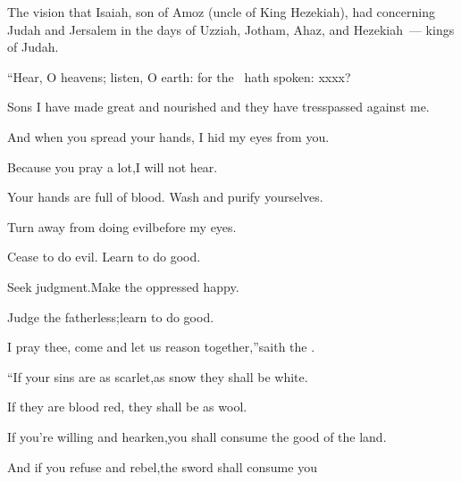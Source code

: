 
\begin{inparaenum}
   The vision that Isaiah, son of Amoz (uncle of King Hezekiah), had concerning Judah and Jersalem in the days of Uzziah, Jotham, Ahaz, and Hezekiah~--- kings of Judah.\smallskip%
  
  \pa {} ``Hear, O heavens; listen, O earth: for the \lord\ hath spoken: xxxx?%
  
  \pa Sons I have made great and nourished and they have tresspassed against me.
  
  
  \pb {} And when you spread your hands,%
  \pa I hid my eyes from you.%
  
  \pc Because you pray a lot,\pa I will not hear.%
  
  \pc Your hands are full of blood.\pa {} Wash and purify yourselves.%
  
  \pc Turn away from doing evil\pa before my eyes.%
  
  \pc Cease to do evil.\pa {} Learn to do good.%
  
  \pc Seek judgment.\pa Make the oppressed happy.%
  
  \pc Judge the fatherless;\pa learn to do good.%
  
  \pb {} I pray thee, come and let us reason together,''\pa saith the \lord.%

  \pc ``If your sins are as scarlet,\pa as snow they shall be white.%

  \pc If they are blood red,%
  \pa they shall be as wool.%
  
  \pb {} If you're willing and hearken,\pa you shall consume the good of the land.%
  
  \pb {} And if you refuse and rebel,\pa the sword shall consume you%
  

\end{inparaenum}
